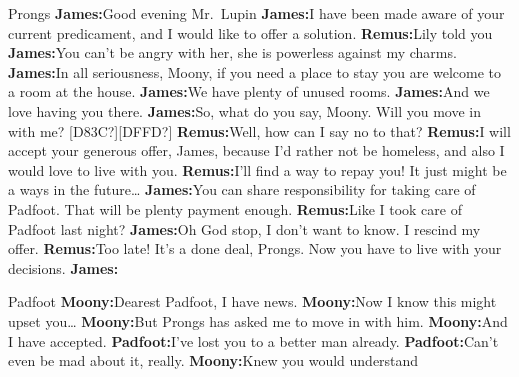 \documentclass[12pt,twoside,openright]{memoir}
\begin{document}
Prongs\newline
\textbf{James:}Good evening Mr.\ Lupin\newline
\textbf{James:}I have been made aware of your current predicament, and I would like to offer a solution.\newline
\textbf{Remus:}Lily told you \newline
\textbf{James:}You can't be angry with her, she is powerless against my charms. \newline
\textbf{James:}In all seriousness, Moony, if you need a place to stay you are welcome to a room at the house.\newline
\textbf{James:}We have plenty of unused rooms.\newline
\textbf{James:}And we love having you there.\newline
\textbf{James:}So, what do you say, Moony. Will you move in with me? [D83C?][DFFD?]\newline
\textbf{Remus:}Well, how can I say no to that?\newline
\textbf{Remus:}I will accept your generous offer, James, because I'd rather not be homeless, and also I would love to live with you. \newline
\textbf{Remus:}I'll find a way to repay you! It just might be a ways in the future…\newline
\textbf{James:}You can share responsibility for taking care of Padfoot. That will be plenty payment enough.\newline
\textbf{Remus:}Like I took care of Padfoot last night? \newline
\textbf{James:}Oh God stop, I don't want to know.  I rescind my offer.\newline
\textbf{Remus:}Too late! It's a done deal, Prongs. Now you have to live with your decisions.\newline
\textbf{James:}

Padfoot\newline
\textbf{Moony:}Dearest Padfoot, I have news.\newline
\textbf{Moony:}Now I know this might upset you…\newline
\textbf{Moony:}But Prongs has asked me to move in with him.\newline
\textbf{Moony:}And I have accepted.\newline
\textbf{Padfoot:}I've lost you to a better man already.\newline
\textbf{Padfoot:}Can't even be mad about it, really.\newline
\textbf{Moony:}Knew you would understand 
\end{document}
